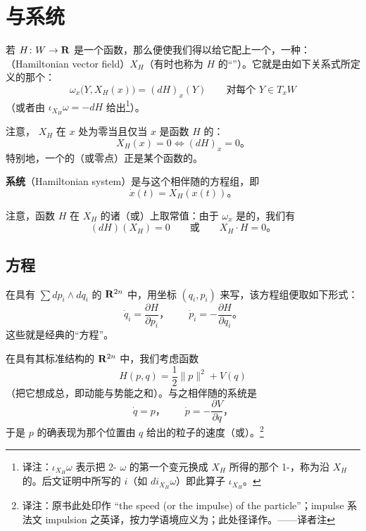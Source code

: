 
\section{\trHamiltonian\trVectorField{}与\trHamiltonian{}系统}
\label{sec:hamiltonian-vector-fields}

若 $H\colon W\to\mathbf{R}$ 是一个函数，那么\trSymplecticForm{}便使我们得以给它配上一个\trVectorField，一种\trGradient：\textbf{\trHamiltonian\trVectorField}（Hamiltonian vector field）$X_H$（有时也称为 $H$ 的“\trSymplectic\trGradient”）。它就是由如下关系式所定义的那个\trVectorField：
\[
\omega_x\bigl(Y,X_H(x)\bigr)=(dH)_x(Y)\qquad\text{对每个 } Y\in T_xW
\]
（或者由 $\iota_{X_H}\omega=-dH$ 给出\footnote{译注：$\iota_{X_H}\omega$ 表示把 2-\trForm{} $\omega$ 的第一个变元换成 $X_H$ 所得的那个 1-\trForm，称为沿 $X_H$ 的\trInnerProduct。后文证明中所写的 $i$（如 $di_{X_H}\omega$）即此算子 $\iota_{X_H}$。}）。

注意，\trVectorField{} $X_H$ 在 $x$ 处为零当且仅当 $x$ 是函数 $H$ 的\trCriticalPoint：
\[
X_H(x)=0\Longleftrightarrow(dH)_x=0\text{。}
\]
特别地，一个\trHamiltonian\trVectorField{}的\trSingularPoint（或零点）正是某个函数的\trCriticalPoint。

\textbf{\trHamiltonian{}系统}（Hamiltonian system）是与这个\trVectorField{}相伴随的\trDifferential{}方程组，即
\[
\dot{x}(t)=X_H(x(t))\text{。}
\]

注意，函数 $H$ 在\trVectorField{} $X_H$ 的诸\trTrajectory（或\trIntegralCurve）上取常值：由于 $\omega_x$ 是\trAlternating{}的，我们有
\[
(dH)(X_H)=0\qquad\text{或}\qquad X_H\cdot H=0\text{。}
\]

\subsection{\trHamilton{}方程}
\label{subsec:hamilton-equations}

在具有\trSymplecticForm{} $\sum dp_i\wedge dq_i$ 的 $\mathbf{R}^{2n}$ 中，用坐标 $(q_i,p_i)$ 来写，该\trDifferential{}方程组便取如下形式：
\[
\dot{q}_i=\frac{\partial H}{\partial p_i}\text{，}\qquad
\dot{p}_i=-\frac{\partial H}{\partial q_i}\text{。}
\]
这些就是经典的“\trHamilton{}方程”。

\begin{example}[“经典”\trHamiltonian{}量]\label{thm:classical-hamiltonian-example}
在具有其标准\trSymplectic{}结构的 $\mathbf{R}^{2n}$ 中，我们考虑函数
\[
H(p,q)=\frac{1}{2}\|p\|^2+V(q)
\]
（把它想成总\trEnergy，即动能与势能之和）。与之相伴随的\trHamiltonian{}系统是
\[
\dot{q}=p\text{，}\qquad
\dot{p}=-\frac{\partial V}{\partial q}\text{，}
\]
于是 $p$ 的确表现为那个位置由 $q$ 给出的粒子的速度（或\trMomentum）。\footnote{译注：原书此处印作 “the speed (or the impulse) of the particle”；impulse 系法文 impulsion 之英译，按力学语境应义为\trMomentum；此处径译作\trMomentum。——译者注}
\end{example}

